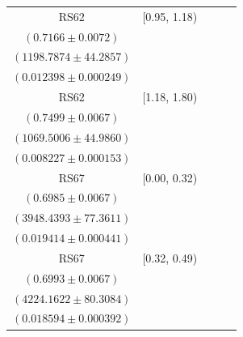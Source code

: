 {\begin{longtable}{|c|c|c|c|c|}
RS62 & [0.95, 1.18) & \begin{tabular}{@{}c@{}}$0.7077 \pm 0.0085$ \\ $(0.7166 \pm 0.0072)$\end{tabular} & \begin{tabular}{@{}c@{}}$1222.3132 \pm 44.9750$ \\ $(1198.7874 \pm 44.2857)$\end{tabular} & \begin{tabular}{@{}c@{}}$0.011893 \pm 0.000457$ \\ $(0.012398 \pm 0.000249)$\end{tabular} \\ \hline
RS62 & [1.18, 1.80) & \begin{tabular}{@{}c@{}}$0.6767 \pm 0.0099$ \\ $(0.7499 \pm 0.0067)$\end{tabular} & \begin{tabular}{@{}c@{}}$1186.6758 \pm 49.8745$ \\ $(1069.5006 \pm 44.9860)$\end{tabular} & \begin{tabular}{@{}c@{}}$0.008053 \pm 0.000282$ \\ $(0.008227 \pm 0.000153)$\end{tabular} \\ \hline
\hline
RS67 & [0.00, 0.32) & \begin{tabular}{@{}c@{}}$0.7529 \pm 0.0042$ \\ $(0.6985 \pm 0.0067)$\end{tabular} & \begin{tabular}{@{}c@{}}$3576.9845 \pm 70.9217$ \\ $(3948.4393 \pm 77.3611)$\end{tabular} & \begin{tabular}{@{}c@{}}$0.018325 \pm 0.000428$ \\ $(0.019414 \pm 0.000441)$\end{tabular} \\ \hline
RS67 & [0.32, 0.49) & \begin{tabular}{@{}c@{}}$0.7541 \pm 0.0043$ \\ $(0.6993 \pm 0.0067)$\end{tabular} & \begin{tabular}{@{}c@{}}$3807.3049 \pm 73.2256$ \\ $(4224.1622 \pm 80.3084)$\end{tabular} & \begin{tabular}{@{}c@{}}$0.017763 \pm 0.000382$ \\ $(0.018594 \pm 0.000392)$\end{tabular} \\ \hline

\end{longtable}}
